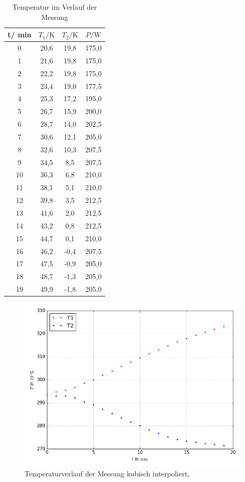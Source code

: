 \begin{table}
\centering
\caption{Temperatur im Verlauf der Messung}
\label{tab:Dicke}
  \begin{tabular}{ S[table-format=1,0] S[table-format=2,1] S[table-format=2,1] S[table-format=3,1]}
    \toprule
    t/ min & $T_1/\si{\kelvin}$ & $T_2/\si{\kelvin}$ & $P/\si{\watt}$\\
       &  20,6 & 19,8 & 175,0\\
    1   &  21,6 & 19,8 & 175,0\\
    2   &  22,2 & 19,8 & 175,0\\
    3   &  23,4 & 19,0 & 177,5\\
    4   &  25,3 & 17,2 & 195,0\\
    5   &  26,7 & 15,9 & 200,0\\
    6   &  28,7 & 14,0 & 202,5\\
    7   &  30,6 & 12,1 & 205,0\\
    8   &  32,6 & 10,3 & 207,5\\
    9   &  34,5 & 8,5  & 207,5\\
    10  &  36,3 & 6,8  & 210,0\\
    11  &  38,1 & 5,1  & 210,0\\
    12  &  39,8 & 3,5  & 212,5\\
    13  &  41,6 & 2,0  & 212,5\\
    14  &  43,2 & 0,8  & 212,5\\
    15  &  44,7 & 0,1  & 210,0\\
    16  &  46,2 & -0,4 & 207,5\\
    17  &  47,5 & -0,9 & 205,0\\
    18  &  48,7 & -1,3 & 205,0\\
    19  &  49,9 & -1,8 & 205,0\\
    \bottomrule
  \end{tabular}
\end{table}

\begin{figure}
  \centering
  \includegraphics[width=\textwidth]{Temperatur.png}
  \caption{Temperaturverlauf der Messung kubisch interpoliert,}
  \label{fig:1}
\end{figure}

